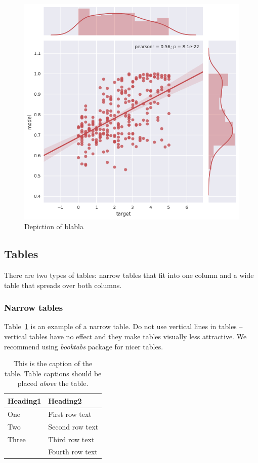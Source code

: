 \documentclass[10pt, a4paper]{article}
\begin{document}
\begin{figure}
\begin{center}
\includegraphics[width=\columnwidth]{only_2nd_layer.png}
\caption{Depiction of blabla}
\label{fig:lstm_2nd_layer}
\end{center}
\end{figure}

\subsection{Tables}

There are two types of tables: narrow tables that fit into one column and a wide table that spreads over both columns.

\subsubsection{Narrow tables}

Table~\ref{tab:narrow-table} is an example of a narrow table. Do not use vertical lines in tables -- vertical tables have no effect and they make tables visually less attractive. We recommend using \textit{booktabs} package for nicer tables.

\begin{table}
\caption{This is the caption of the table. Table captions should be placed \textit{above} the table.}
\label{tab:narrow-table}
\begin{center}
\begin{tabular}{ll}
\toprule
Heading1 & Heading2 \\
\midrule
One & First row text \\
Two   & Second row text \\
Three   & Third row text \\
      & Fourth row text \\
\bottomrule
\end{tabular}
\end{center}
\end{table}
\end{document}
